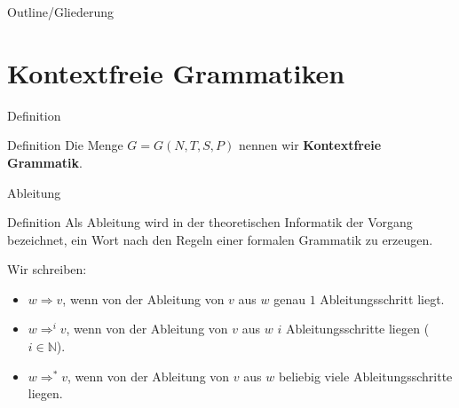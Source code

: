 
\subtitle{Foliensatz 5}
\date{15. November 2012}



\begin{frame}
    \titlepage
\end{frame}

\begin{frame}{Outline/Gliederung}
    \tableofcontents
\end{frame}

\section{Kontextfreie Grammatiken}
\begin{frame}{Definition}
    \begin{block}{Definition}
        Die Menge $G = G \left( N, T, S, P \right)$ nennen wir \textbf{Kontextfreie Grammatik}.
    \end{block}
    \pause
\end{frame}

\begin{frame}{Ableitung}
    \begin{block}{Definition}
        Als Ableitung wird in der theoretischen Informatik der Vorgang bezeichnet, ein Wort nach den Regeln einer formalen Grammatik zu erzeugen.
    \end{block}
    Wir schreiben: \pause
    \begin{itemize}
        \item $w \Rightarrow v$, wenn von der Ableitung von $v$ aus $w$ genau $1$ Ableitungsschritt liegt.\pause
        \item $w \Rightarrow^i v$, wenn von der Ableitung von $v$ aus $w$ $i$ Ableitungsschritte liegen ($i \in \mathbb{N}$).\pause
        \item $w \Rightarrow^* v$, wenn von der Ableitung von $v$ aus $w$ beliebig viele Ableitungsschritte liegen.
    \end{itemize}
\end{frame}

